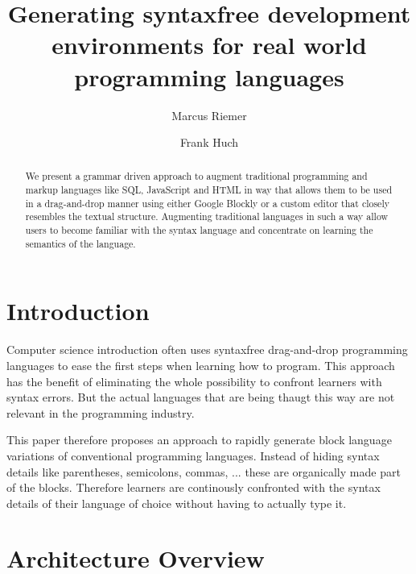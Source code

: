\documentclass[sigconf,review=true]{acmart}
\begin{document}
\title[]{Generating syntaxfree development environments for real world programming languages}

\author{Marcus Riemer}

\author{Frank Huch}

\begin{abstract}
  We present a grammar driven approach to augment traditional programming and markup languages like SQL, JavaScript and HTML in way that allows them to be used in a drag-and-drop manner using either Google Blockly or a custom editor that closely resembles the textual structure. Augmenting traditional languages in such a way allow users to become familiar with the syntax language and concentrate on learning the semantics of the language.
\end{abstract}

\maketitle

\section{Introduction}

Computer science introduction often uses syntaxfree drag-and-drop programming languages to ease the first steps when learning how to program. This approach has the benefit of eliminating the whole possibility to confront learners with syntax errors. But the actual languages that are being thaugt this way are not relevant in the programming industry.

This paper therefore proposes an approach to rapidly generate block language variations of conventional programming languages. Instead of hiding syntax details like parentheses, semicolons, commas, ... these are organically made part of the blocks. Therefore learners are continously confronted with the syntax details of their language of choice without having to actually type it.

\section{Architecture Overview}
\end{document}
